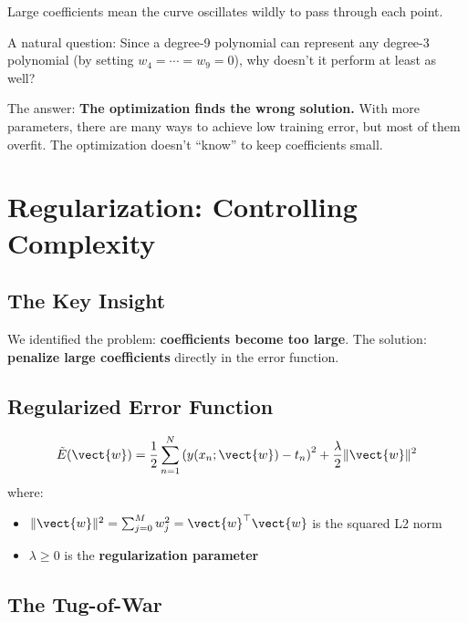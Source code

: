 Large coefficients mean the curve oscillates wildly to pass through each point.

\begin{bluebox}
A natural question: Since a degree-9 polynomial can represent any degree-3 polynomial (by setting $w_4 = \cdots = w_9 = 0$), why doesn't it perform at least as well?

The answer: \textbf{The optimization finds the wrong solution.} With more parameters, there are many ways to achieve low training error, but most of them overfit. The optimization doesn't ``know'' to keep coefficients small.
\end{bluebox}


\section{Regularization: Controlling Complexity}

\subsection{The Key Insight}

We identified the problem: \textbf{coefficients become too large}. The solution: \textbf{penalize large coefficients} directly in the error function.

\subsection{Regularized Error Function}

\begin{definitionbox}
\[
\tilde{E}(\vect{w}) = \frac{1}{2} \sum_{n=1}^{N} \left( y(x_n; \vect{w}) - t_n \right)^2 + \frac{\lambda}{2} \|\vect{w}\|^2
\]
where:
\begin{itemize}
    \item $\|\vect{w}\|^2 = \sum_{j=0}^{M} w_j^2 = \vect{w}^\top \vect{w}$ is the squared L2 norm
    \item $\lambda \geq 0$ is the \textbf{regularization parameter}
\end{itemize}
\end{definitionbox}

\subsection{The Tug-of-War}

